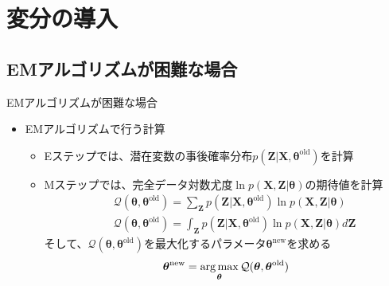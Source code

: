 \documentclass[dvipdfmx,notheorems,t]{beamer}
\begin{document}
\section{変分の導入}

\subsection{EMアルゴリズムが困難な場合}

\begin{frame}{EMアルゴリズムが困難な場合}

\begin{itemize}
	\item EMアルゴリズムで行う計算
	\begin{itemize}
		\item \alert{Eステップ}では、潜在変数の事後確率分布$p(\bm{Z} | \bm{X}, \bm{\theta}^\mathrm{old})$を計算
		\newline
		\item \alert{Mステップ}では、完全データ対数尤度$\ln p(\bm{X}, \bm{Z} | \bm{\theta})$の期待値を計算
		\begin{eqnarray}
			&& \mathcal{Q}(\bm{\theta}, \bm{\theta}^\mathrm{old}) = \sum_{\bm{Z}} p(\bm{Z} | \bm{X}, \bm{\theta}^\mathrm{old}) \ln p(\bm{X}, \bm{Z} | \bm{\theta}) \\
			&& \mathcal{Q}(\bm{\theta}, \bm{\theta}^\mathrm{old}) = \int_{\bm{Z}} p(\bm{Z} | \bm{X}, \bm{\theta}^\mathrm{old}) \ln p(\bm{X}, \bm{Z} | \bm{\theta}) d\bm{Z}
		\end{eqnarray}
		そして、$\mathcal{Q}(\bm{\theta}, \bm{\theta}^\mathrm{old})$を最大化するパラメータ$\bm{\theta}^\mathrm{new}$を求める
		\begin{equation}
			\bm{\theta}^\mathrm{new} = \operatorname*{arg\,max}_{\bm{\theta}} \mathcal{Q}(\bm{\theta}, \bm{\theta}^\mathrm{old})
		\end{equation}
	\end{itemize}
\end{itemize}

\end{frame}
\end{document}
